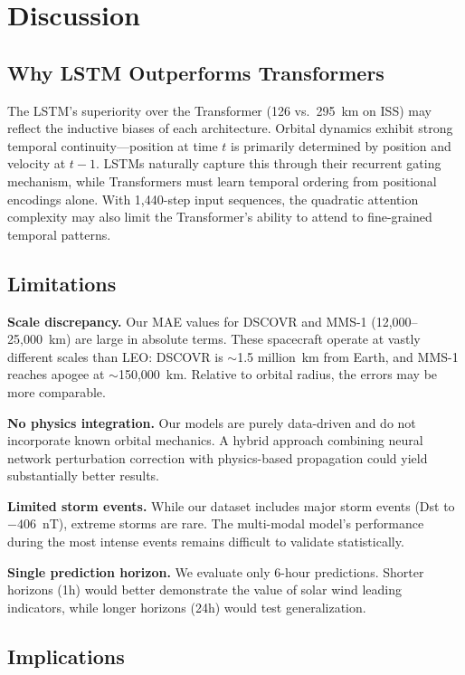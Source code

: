 \documentclass[twocolumn]{article}
\begin{document}
\section{Discussion}
\label{sec:discussion}

\subsection{Why LSTM Outperforms Transformers}

The LSTM's superiority over the Transformer (126 vs.\ 295~km on ISS)
may reflect the inductive biases of each architecture. Orbital dynamics
exhibit strong temporal continuity---position at time $t$ is primarily
determined by position and velocity at $t-1$. LSTMs naturally capture
this through their recurrent gating mechanism, while Transformers must
learn temporal ordering from positional encodings alone. With 1,440-step
input sequences, the quadratic attention complexity may also limit the
Transformer's ability to attend to fine-grained temporal patterns.

\subsection{Limitations}

\textbf{Scale discrepancy.} Our MAE values for DSCOVR and MMS-1
(12,000--25,000~km) are large in absolute terms. These spacecraft
operate at vastly different scales than LEO: DSCOVR is $\sim$1.5 million~km
from Earth, and MMS-1 reaches apogee at $\sim$150,000~km. Relative to
orbital radius, the errors may be more comparable.

\textbf{No physics integration.} Our models are purely data-driven and do
not incorporate known orbital mechanics. A hybrid approach combining
neural network perturbation correction with physics-based propagation
could yield substantially better results.

\textbf{Limited storm events.} While our dataset includes major storm
events (Dst to $-406$~nT), extreme storms are rare. The multi-modal model's
performance during the most intense events remains difficult to validate
statistically.

\textbf{Single prediction horizon.} We evaluate only 6-hour predictions.
Shorter horizons (1h) would better demonstrate the value of solar wind
leading indicators, while longer horizons (24h) would test generalization.

\subsection{Implications}
\end{document}
